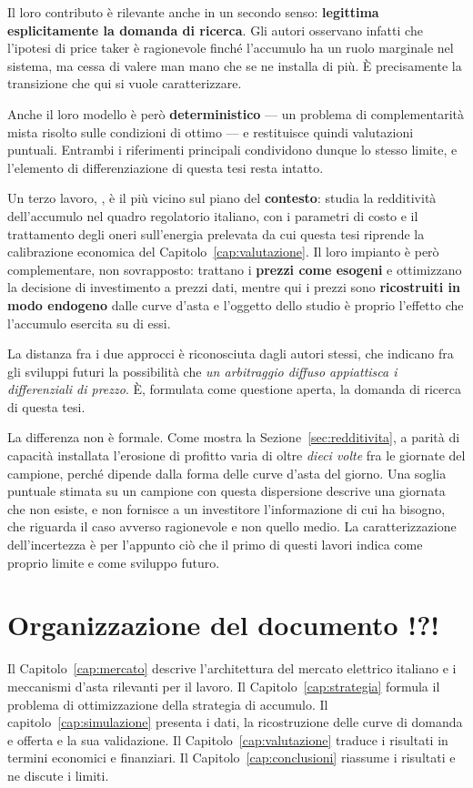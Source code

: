 Il loro contributo \`e rilevante anche in un secondo senso: \textbf{legittima esplicitamente la
domanda di ricerca}. Gli autori osservano infatti che l'ipotesi di price taker \`e ragionevole
finch\'e l'accumulo ha un ruolo marginale nel sistema, ma cessa di valere man mano che se ne
installa di pi\`u. \`E precisamente la transizione che qui si vuole caratterizzare.

Anche il loro modello \`e per\`o \textbf{deterministico} — un problema di complementarit\`a
mista risolto sulle condizioni di ottimo — e restituisce quindi valutazioni puntuali. Entrambi i
riferimenti principali condividono dunque lo stesso limite, e l'elemento di differenziazione di
questa tesi resta intatto.

Un terzo lavoro, \textcite{su18031404}, \`e il pi\`u vicino sul piano del
\textbf{contesto}: studia la redditivit\`a dell'accumulo nel quadro regolatorio italiano,
con i parametri di costo e il trattamento degli oneri sull'energia prelevata da cui questa
tesi riprende la calibrazione economica del Capitolo~\ref{cap:valutazione}. Il loro impianto
\`e per\`o complementare, non sovrapposto: trattano i \textbf{prezzi come esogeni} e
ottimizzano la decisione di investimento a prezzi dati, mentre qui i prezzi sono
\textbf{ricostruiti in modo endogeno} dalle curve d'asta e l'oggetto dello studio \`e proprio
l'effetto che l'accumulo esercita su di essi.

La distanza fra i due approcci \`e riconosciuta dagli autori stessi, che indicano fra gli
sviluppi futuri la possibilit\`a che \emph{un arbitraggio diffuso appiattisca i differenziali
di prezzo}. \`E, formulata come questione aperta, la domanda di ricerca di questa tesi.

La differenza non \`e formale. Come mostra la Sezione~\ref{sec:redditivita}, a parit\`a di
capacit\`a installata l'erosione di profitto varia di oltre \emph{dieci volte} fra le giornate
del campione, perch\'e dipende dalla forma delle curve d'asta del giorno. Una soglia puntuale
stimata su un campione con questa dispersione descrive una giornata che non esiste, e non
fornisce a un investitore l'informazione di cui ha bisogno, che riguarda il caso avverso
ragionevole e non quello medio. La caratterizzazione dell'incertezza \`e per l'appunto ci\`o
che il primo di questi lavori indica come proprio limite e come sviluppo futuro.

\section{Organizzazione del documento !?!}
\label{sec:organizzazione}

Il Capitolo~\ref{cap:mercato} descrive l'architettura del mercato elettrico italiano e i meccanismi d'asta rilevanti per il lavoro. Il Capitolo~\ref{cap:strategia} formula il problema di ottimizzazione della strategia di accumulo. Il capitolo~\ref{cap:simulazione} presenta i dati, la ricostruzione delle curve di domanda e offerta e la sua validazione. Il
Capitolo~\ref{cap:valutazione} traduce i risultati in termini economici e finanziari. Il Capitolo~\ref{cap:conclusioni} riassume i risultati e ne discute i limiti.



